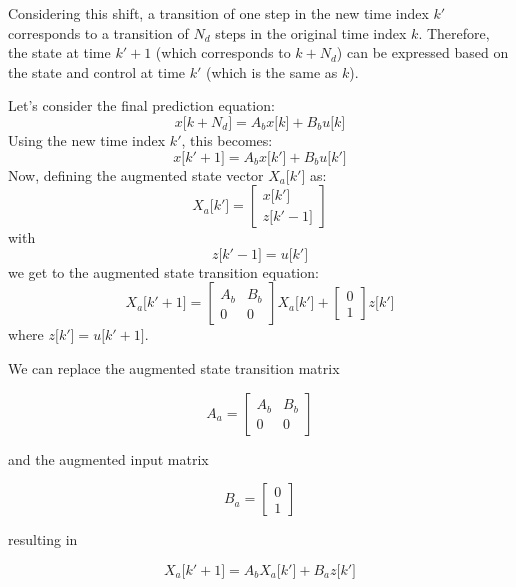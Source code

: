 Considering this shift, a transition of one step in the new time index $k'$ corresponds to a transition of $N_d$ 
steps in the original time index $k$. Therefore, the state at time $k'+1$ (which corresponds to $k+N_d$) can 
be expressed based on the state and control at time $k'$ (which is the same as $k$).

Let's consider the final prediction equation:
\noindent
\begin{equation}
    x\big[k+N_d\big] = A_b x\big[k\big] + B_b u\big[k\big]
\end{equation}
Using the new time index $k'$, this becomes:
\noindent
\begin{equation}
    x\big[k'+1\big] = A_b x\big[k'\big] + B_b u\big[k'\big]
\end{equation}
Now, defining the augmented state vector $X_a\big[k'\big]$ as:
\noindent
\begin{equation}
    X_a\big[k'\big] = 
    \begin{bmatrix}
        x\big[k'\big] \\
        z\big[k'-1\big]
    \end{bmatrix}
\end{equation}
with
\noindent
\begin{equation}
    z\big[k'-1\big] = u\big[k'\big]
\end{equation}
we get to the augmented state transition equation:
\noindent
\begin{equation}
    X_a \big[k'+1\big] = 
    \begin{bmatrix}
        A_b & B_b \\
        0 & 0
    \end{bmatrix}
    X_a\big[k'\big]
    +
    \begin{bmatrix}
        0 \\
        1
    \end{bmatrix}
    z\big[k'\big]
\end{equation}
where $z\big[k'\big] = u\big[k' + 1\big]$.

We can replace the augmented state transition matrix

\begin{equation}
    A_a = 
    \begin{bmatrix}
        A_b & B_b \\
        0 & 0
    \end{bmatrix}
\end{equation}

and the augmented input matrix

\begin{equation}
    B_a = 
    \begin{bmatrix}
        0 \\
        1
    \end{bmatrix}
\end{equation}

resulting in 

\begin{equation}
    X_a \big[k'+1\big] = 
    A_b X_a \big[k'\big] +
    B_a z\big[k'\big]
\end{equation}